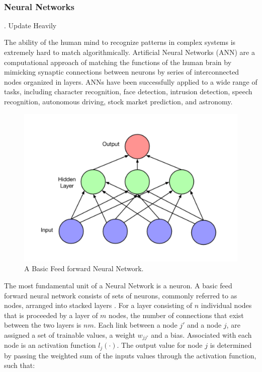 \documentclass{article}
\begin{document}
$$

\subsubsection{\label{sec:level3}Neural Networks}

. Update Heavily 

The ability of the human mind to recognize patterns in complex systems is extremely hard to match algorithmically. Artificial Neural Networks (ANN) are a computational approach of matching the functions of the human brain by mimicking synaptic connections between neurons by series of interconnected nodes organized in layers. ANNs have been successfully applied to a wide range of tasks, including character recognition, face detection, intrusion detection, speech recognition, autonomous driving, stock market prediction, and astronomy. 


\begin{figure}
\centering
\includegraphics[width=1\linewidth]{basic_net.png}
\caption{A Basic Feed forward Neural Network.}
\label{fig:ANN}
\end{figure}

The most fundamental unit of a Neural Network is a neuron. A basic feed forward neural network consists of sets of neurons, commonly referred to as nodes, arranged into stacked layers \cite{ANN}. For a layer consisting of \(n\) individual nodes that is proceeded by a layer of \(m\) nodes, the number of connections that exist between the two layers is \(nm\). Each link between a node \(j'\) and a node \(j\), are assigned a set of trainable values, a weight \(w_{jj'}\) and a bias. Associated with each node is an activation function \(l_j(\cdot)\). The output value for node \(j\) is determined by passing the weighted sum of the inputs values through the activation function, such that:
\end{document}

